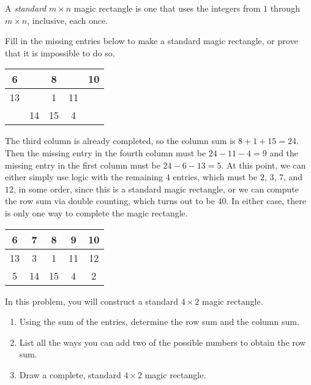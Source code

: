 \documentclass[11pt]{article}
\renewenvironment{problem}{\begin{problems}}{\end{problems}\vspace{5pt}}
\begin{document}
\begin{definition}
A \textit{standard} $m \times n$ magic rectangle is one that uses the integers from $1$ through $m\times n$, inclusive, each once.
\end{definition}

\begin{problem}[3 points]
Fill in the missing entries below to make a standard magic rectangle, or prove that it is impossible to do so.
\begin{center}
\begin{tabular}{|c|c|c|c|c|}
\hline
6 & \phantom{7} & 8 & \phantom{9} & 10 \\ \hline
13 & \phantom{3} & 1 & 11 & \phantom{12} \\ \hline
\phantom{5} & 14 & 15 & 4 & \phantom{2} \\ \hline
\end{tabular}
\end{center}
\end{problem}

\begin{solution}
The third column is already completed, so the column sum is $8+1+15 = 24$. Then the missing entry in the
fourth column must be $24-11-4=9$ and the missing entry in the first column must be $24-6-13=5$.
At this point, we can either simply use logic with the remaining $4$ entries, which must be
$2$, $3$, $7$, and $12$, in some order, since this is a standard magic rectangle, or we can compute
the row sum via double counting, which turns out to be $40$. In either case, there is only one way to complete the magic rectangle.
\begin{center}
\begin{tabular}{|c|c|c|c|c|}
\hline
6 & 7 & 8 & 9 & 10 \\ \hline
13 & 3 & 1 & 11 & 12 \\ \hline
5 & 14 & 15 & 4 & 2 \\ \hline
\end{tabular}
\end{center}
\end{solution}


\begin{problem}[8=2+2+4 points]
In this problem, you will construct a standard $4 \times 2$ magic rectangle.
\begin{enumerate}[label=(\alph*)]
\item Using the sum of the entries, determine the row sum and the column sum.

\item List all the ways you can add two of the possible numbers to obtain the row sum.

\item Draw a complete, standard $4 \times 2$ magic rectangle.
\end{enumerate}
\end{problem}
\end{document}
